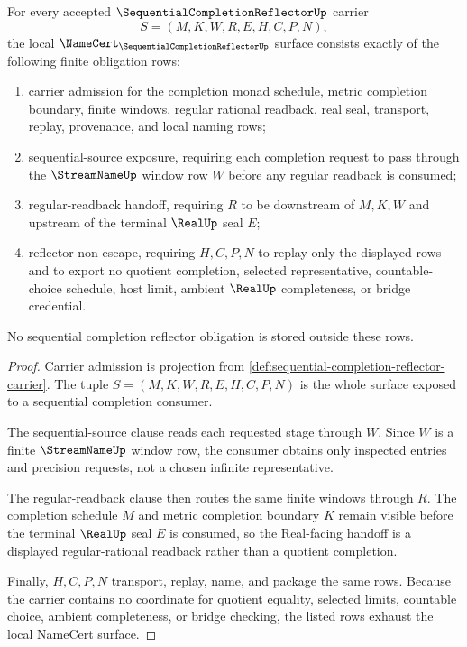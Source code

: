 \begin{theorem}
\label{thm:sequential-completion-reflector-namecert-obligations}
For every accepted $\SequentialCompletionReflectorUp$ carrier
$$
S=(M,K,W,R,E,H,C,P,N),
$$
the local $\NameCert_{\SequentialCompletionReflectorUp}$ surface consists exactly of the following finite obligation rows:
\begin{enumerate}
\item carrier admission for the completion monad schedule, metric completion boundary, finite windows, regular rational readback, real seal, transport, replay, provenance, and local naming rows;
\item sequential-source exposure, requiring each completion request to pass through the $\StreamNameUp$ window row $W$ before any regular readback is consumed;
\item regular-readback handoff, requiring $R$ to be downstream of $M,K,W$ and upstream of the terminal $\RealUp$ seal $E$;
\item reflector non-escape, requiring $H,C,P,N$ to replay only the displayed rows and to export no quotient completion, selected representative, countable-choice schedule, host limit, ambient $\RealUp$ completeness, or bridge credential.
\end{enumerate}
No sequential completion reflector obligation is stored outside these rows.
\end{theorem}
\begin{proof}
Carrier admission is projection from \autoref{def:sequential-completion-reflector-carrier}. The tuple $S=(M,K,W,R,E,H,C,P,N)$ is the whole surface exposed to a sequential completion consumer.

The sequential-source clause reads each requested stage through $W$. Since $W$ is a finite $\StreamNameUp$ window row, the consumer obtains only inspected entries and precision requests, not a chosen infinite representative.

The regular-readback clause then routes the same finite windows through $R$. The completion schedule $M$ and metric completion boundary $K$ remain visible before the terminal $\RealUp$ seal $E$ is consumed, so the Real-facing handoff is a displayed regular-rational readback rather than a quotient completion.

Finally, $H,C,P,N$ transport, replay, name, and package the same rows. Because the carrier contains no coordinate for quotient equality, selected limits, countable choice, ambient completeness, or bridge checking, the listed rows exhaust the local NameCert surface.
\end{proof}

